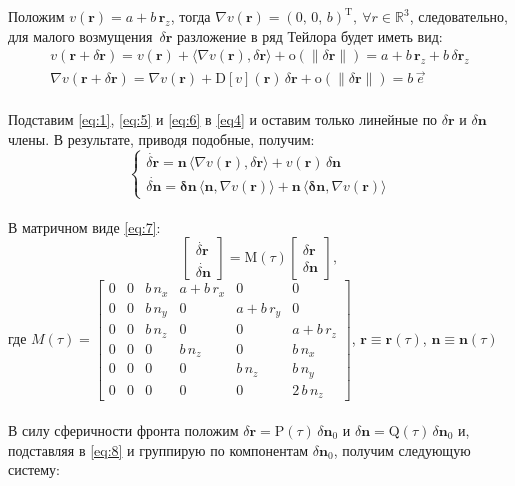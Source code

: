 \documentclass{article}
\newcommand{\bfv}[1]{\mathbf{#1}}
\newcommand{\dd}[1]{\dot{#1}}
\newcommand{\dv}[1]{\nabla v(#1)}
\newcommand{\ddv}[1]{\mathrm{D}[v](#1)}
\newcommand{\dr}{\delta \bfv{r}}
\newcommand{\dn}{\delta \bfv{n}}
\newcommand{\om}[1]{\mathrm{o}(#1)}
\newcommand{\dprod}[2]{\langle #1, #2 \rangle}
\newcommand{\T}[1]{#1^\mathrm{T}}
\newcommand{\matr}[1]{\mathrm{#1}}
\newcommand{\R}{\mathbb{R}}
\begin{document}
Положим $v(\bfv{r}) = a + b\,\bfv{r}_z$, тогда $\dv{\bfv{r}} = \T{(0,\,0,\,b)}, \ \forall r \in \R^3$, следовательно, для малого возмущения~$\dr$ разложение в ряд Тейлора будет иметь вид:
\begin{gather} \label{eq:5} 
v(\bfv{r} + \dr) = v(\bfv{r}) + \dprod{\dv{\bfv{r}}}{\dr} + \om{\|\dr\|} = a + b\,\bfv{r}_z + b\,\dr_z\\ 
\label{eq:6} 
\dv{\bfv{r} + \dr} = \dv{\bfv{r}} + \ddv{\bfv{r}}\,\dr + \om{\|\dr\|} = b\,\vec{e}
\end{gather}\\
Подставим \eqref{eq:1}, \eqref{eq:5} и \eqref{eq:6} в \eqref{eq4} и оставим только линейные по $\dr$ и $\dn$ члены. В результате, приводя подобные, получим:
\begin{equation} \label{eq:7}
\begin{cases}
\dd{\dr} = \bfv{n}\,\dprod{\dv{\bfv{r}}}{\dr} + v(\bfv{r})\,\dn\\
\dd{\dn} = \bfv{\dn}\,\dprod{\bfv{n}}{\dv{\bfv{r}}} + \bfv{n}\,\dprod{\bfv{\dn}}{\dv{\bfv{r}}}
\end{cases}
\end{equation}\\
В матричном виде \eqref{eq:7}:
\begin{equation} \label{eq:8}
\begin{bmatrix}
    \dd{\dr}\\
    \dd{\dn}
\end{bmatrix} = \matr{M}(\tau) 
\begin{bmatrix}
    \dr\\
    \dn
\end{bmatrix},
\end{equation} где $ M(\tau) = \begin{bmatrix}
    0 & 0 & b\,n_x & a + b\,r_x & 0 & 0\\
    0 & 0 & b\,n_y & 0 & a + b\,r_y & 0\\
    0 & 0 & b\,n_z & 0 & 0 & a + b\,r_z\\
    0 & 0 & 0 & b\,n_z & 0 & b\,n_x\\
    0 & 0 & 0 & 0 & b\,n_z & b\,n_y\\
    0 & 0 & 0 & 0 & 0 & 2\,b\,n_z
\end{bmatrix}$, $\bfv{r} \equiv \bfv{r}(\tau)$, $\bfv{n} \equiv \bfv{n}(\tau)$\\\\
В силу сферичности фронта положим $\dr = \matr{P}(\tau)\,\dn_0$ и $\dn = \matr{Q}(\tau)\,\dn_0$ и, подставляя в \eqref{eq:8} и группирую по компонентам $\dn_0$, получим следующую систему:\\
\end{document}
